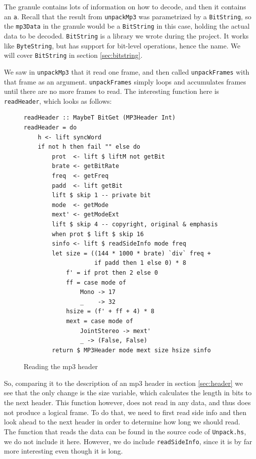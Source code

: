 \documentclass[a4paper,12pt]{article}
\begin{document}
    The granule contains lots of information on how to decode, and then it
    contains an \texttt{a}. Recall that the result from \texttt{unpackMp3} was
    parametrized by a \texttt{BitString}, so the \texttt{mp3Data} in the granule
    would be a \texttt{BitString} in this case, holding the actual data to be
    decoded. \texttt{BitString} is a library we wrote during the project. It
    works like \texttt{ByteString}, but has support for bit-level operations,
    hence the name. We will cover \texttt{BitString} in section
    \ref{sec:bitstring}.

    We saw in \texttt{unpackMp3} that it read one frame, and then called
    \texttt{unpackFrames} with that frame as an argument. \texttt{unpackFrames}
    simply loops and accumulates frames until there are no more frames to read.
    The interesting function here is \texttt{readHeader}, which looks as
    follows:
\begin{figure}[h]
  \begin{center}
    \begin{lstlisting}
readHeader :: MaybeT BitGet (MP3Header Int)
readHeader = do
    h <- lift syncWord
    if not h then fail "" else do
        prot  <- lift $ liftM not getBit
        brate <- getBitRate
        freq  <- getFreq
        padd  <- lift getBit
        lift $ skip 1 -- private bit
        mode  <- getMode
        mext' <- getModeExt
        lift $ skip 4 -- copyright, original & emphasis
        when prot $ lift $ skip 16
        sinfo <- lift $ readSideInfo mode freq
        let size = ((144 * 1000 * brate) `div` freq +
                    if padd then 1 else 0) * 8
            f' = if prot then 2 else 0
            ff = case mode of
                Mono -> 17
                _    -> 32
            hsize = (f' + ff + 4) * 8
            mext = case mode of
                JointStereo -> mext'
                _ -> (False, False)
        return $ MP3Header mode mext size hsize sinfo
    \end{lstlisting}
    \caption{Reading the mp3 header}\label{fig:read_mp3_header}
  \end{center}
\end{figure}

    So, comparing it to the description of an mp3 header in section
    \ref{sec:header} we see that the only change is the size variable, which
    calculates the length in bits to the next header. This function however,
    does not read in any data, and thus does not produce a logical frame. To do
    that, we need to first read side info and then look ahead to the next
    header in order to determine how long we should read. The function that
    reads the data can be found in the source code of \texttt{Unpack.hs}, we do
    not include it here. However, we do include \texttt{readSideInfo}, since it
    is by far more interesting even though it is long.
\end{document}
